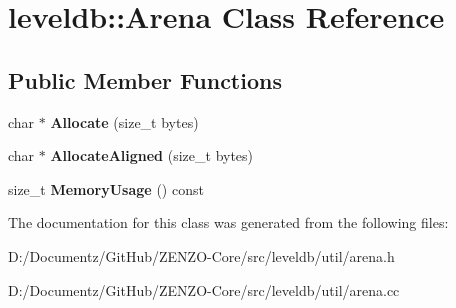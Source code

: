 \hypertarget{classleveldb_1_1_arena}{}\section{leveldb\+::Arena Class Reference}
\label{classleveldb_1_1_arena}
\subsection*{Public Member Functions}
\begin{DoxyCompactItemize}
\item 
\mbox{\label{classleveldb_1_1_arena_add4bc4b1c8fdf5be7a96a7ec00a0732e}} 
char $\ast$ {\bfseries Allocate} (size\+\_\+t bytes)
\item 
\mbox{\label{classleveldb_1_1_arena_a9c1e8e695fe25ac96063f9fbacefee9e}} 
char $\ast$ {\bfseries Allocate\+Aligned} (size\+\_\+t bytes)
\item 
\mbox{\label{classleveldb_1_1_arena_a46ae29ec67c1b5aa9d1b258c2ead1aee}} 
size\+\_\+t {\bfseries Memory\+Usage} () const
\end{DoxyCompactItemize}


The documentation for this class was generated from the following files\+:\begin{DoxyCompactItemize}
\item 
D\+:/\+Documentz/\+Git\+Hub/\+Z\+E\+N\+Z\+O-\/\+Core/src/leveldb/util/arena.\+h\item 
D\+:/\+Documentz/\+Git\+Hub/\+Z\+E\+N\+Z\+O-\/\+Core/src/leveldb/util/arena.\+cc\end{DoxyCompactItemize}
